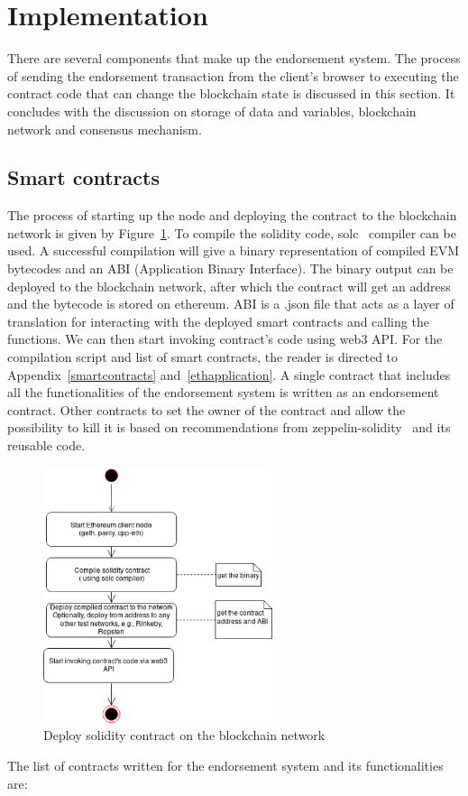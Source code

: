 \section{Implementation} \label{sec:implementation}
There are several components that make up the endorsement system. The process
of sending the endorsement transaction from the client's browser to executing
the contract code that can change the blockchain state is discussed in this
section. It concludes with the discussion on storage of data and variables,
blockchain network and consensus mechanism.

\subsection{Smart contracts} \label{subsec:smartcontracts}
The process of starting up the node and deploying the contract to the
blockchain network is given by Figure~\ref{fig:startup}. To compile the
solidity code, solc~\cite{} compiler can be used. A successful compilation will
give a binary representation of compiled EVM bytecodes and an ABI (Application
Binary Interface). The binary output can be deployed to the blockchain network,
after which the contract will get an address and the bytecode is stored on
ethereum. ABI is a .json file that acts as a layer of translation for
interacting with the deployed smart contracts and calling the functions. We can
then start invoking contract's code using web3 API. For the compilation script
and list of smart contracts, the reader is directed to
Appendix~\ref{smartcontracts} and~\ref{ethapplication}. A single contract that
includes all the functionalities of the endorsement system is written as an
endorsement contract. Other contracts to set the owner of the contract and
allow the possibility to kill it is based on recommendations from
zeppelin-solidity~\cite{zeppelin-solidity} and its reusable code. \par
\begin{figure}
	\centering
	\includegraphics[width=0.6\textwidth]{Images/DeployContract.eps}
	\caption{Deploy solidity contract on the blockchain network}
	\label{fig:startup}
\end{figure}
The list of contracts written for the endorsement system and its
functionalities are: 
